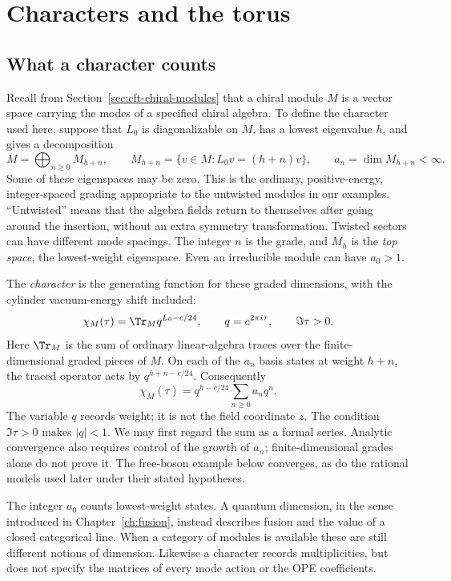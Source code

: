 \section{Characters and the torus}
\label{sec:cft-characters}

\subsection{What a character counts}

Recall from Section~\ref{sec:cft-chiral-modules} that a chiral module
$M$ is a vector space carrying the modes of a specified chiral
algebra. To define the character used here, suppose that $L_0$ is
diagonalizable on $M$, has a lowest eigenvalue $h$, and gives a
decomposition
\[
 M=\bigoplus_{n\ge0}M_{h+n},\qquad
 M_{h+n}=\{v\in M:L_0v=(h+n)v\},\qquad
 a_n=\dim M_{h+n}<\infty.
\]
Some of these eigenspaces may be zero. This is the ordinary,
positive-energy, integer-spaced grading appropriate to the untwisted
modules in our examples. ``Untwisted'' means that the algebra fields
return to themselves after going around the insertion, without an
extra symmetry transformation. Twisted sectors can have different
mode spacings. The integer $n$ is the grade, and $M_h$ is the
\emph{top space}, the lowest-weight eigenspace. Even an irreducible
module can have $a_0>1$.

The \emph{character} is the generating function for these graded
dimensions, with the cylinder vacuum-energy shift included:
\begin{equation}
 \chi_M(\tau)=\Tr_M q^{L_0-c/24},\qquad
 q=e^{2\pi i\tau},\qquad \Im\tau>0.
 \label{eq:cft-character}
\end{equation}
Here $\Tr_M$ is the sum of ordinary linear-algebra traces over the
finite-dimensional graded pieces of $M$. On each of the $a_n$
basis states at weight $h+n$, the traced
operator acts by $q^{h+n-c/24}$. Consequently
\[
 \chi_M(\tau)=q^{h-c/24}\sum_{n\ge0}a_nq^n.
\]
The variable $q$ records weight; it is not the field coordinate $z$.
The condition $\Im\tau>0$ makes $|q|<1$. We may first regard the
sum as a formal series. Analytic convergence also requires control
of the growth of $a_n$; finite-dimensional grades alone do not prove
it. The free-boson example below converges, as do the rational models
used later under their stated hypotheses.

The integer $a_0$ counts lowest-weight states. A quantum dimension,
in the sense introduced in Chapter~\ref{ch:fusion}, instead describes
fusion and the value of a closed categorical line. When a category of
modules is available these are still different notions of dimension.
Likewise a character records multiplicities, but does not specify the
matrices of every mode action or the OPE coefficients.

